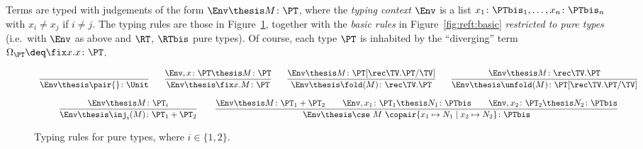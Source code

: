 Terms are typed with judgements of the form
$\Env \thesis M \colon \PT$, where the \emph{typing context} $\Env$ is a list
$x_1\colon \PTbis_1, \dots, x_n\colon \PTbis_n$ with $x_i \neq x_j$
if $i \neq j$.
The typing rules are those in Figure~\ref{fig:pure},
together with the \emph{basic rules} in Figure~\ref{fig:reft:basic}
\emph{restricted to pure types}
(i.e.\ with $\Env$ as above and $\RT$, $\RTbis$ pure types).
Of course, each type $\PT$ is inhabited
by the ``diverging'' term $\Omega_\PT \deq \fix x.x \colon \PT$.


\begin{figure}[t!]
\centering
\(
\begin{array}{c}
%
\dfrac{}
  {\Env \thesis \pair{} \colon \Unit}
%
\quad~~
%
\dfrac{\Env,x\colon \PT \thesis M \colon \PT}
  {\Env \thesis \fix x.M \colon \PT}
%
\quad~~
%
\dfrac{\Env \thesis M \colon \PT[\rec\TV.\PT/\TV]}
  {\Env \thesis \fold(M) \colon \rec\TV.\PT}
%
\quad~~
%
\dfrac{\Env \thesis M \colon \rec\TV.\PT}
  {\Env \thesis \unfold(M) \colon \PT[\rec\TV.\PT/\TV]}
%
\\\\
%
\dfrac{\Env \thesis M \colon \PT_i}
  {\Env \thesis \inj_i(M) \colon \PT_1 + \PT_2}
%
\qquad
%
\dfrac{\Env \thesis M \colon \PT_1 + \PT_2
  \qquad \Env, x_1 \colon \PT_1 \thesis N_1 \colon \PTbis
  \qquad \Env, x_2 \colon \PT_2 \thesis N_2 \colon \PTbis}
  {\Env \thesis \cse\ M\ \copair{x_1 \mapsto N_1 \mid x_2 \mapsto N_2} \colon \PTbis}
%
\end{array}
\)
\caption{Typing rules for pure types, where $i \in \{1,2\}$.%
\label{fig:pure}}
\end{figure}

